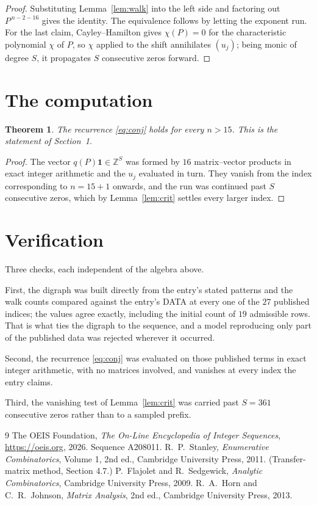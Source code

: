\documentclass[11pt,a4paper]{article}
\theoremstyle{plain}
\newtheorem{theorem}{Theorem}
\theoremstyle{definition}
\begin{document}
\begin{proof}
Substituting Lemma~\ref{lem:walk} into the left side and factoring out
$P^{\,n-2-16}$ gives the identity. The equivalence follows by letting the exponent
run. For the last claim, Cayley--Hamilton gives $\chi(P)=0$ for the characteristic
polynomial $\chi$ of $P$, so $\chi$ applied to the shift annihilates $(u_j)$; being monic of
degree $S$, it propagates $S$ consecutive zeros forward.
\end{proof}

\section{The computation}

\begin{theorem}
The recurrence \eqref{eq:conj} holds for every $n>15$. This is the statement of
Section~1.
\end{theorem}

\begin{proof}
The vector $q(P)\mathbf{1}\in\mathbb{Z}^{S}$ was formed by $16$ matrix--vector
products in exact integer arithmetic and the $u_j$ evaluated in turn. They vanish from the
index corresponding to $n=15+1$ onwards, and the run was continued past $S$ consecutive
zeros, which by Lemma~\ref{lem:crit} settles every larger index.
\end{proof}

\section{Verification}

Three checks, each independent of the algebra above.

First, the digraph was built directly from the entry's stated patterns and the walk counts
compared against the entry's DATA at every one of the $27$ published indices; the
values agree exactly, including the initial count of $19$ admissible rows. That is
what ties the digraph to the sequence, and a model reproducing only part of the published
data was rejected wherever it occurred.

Second, the recurrence \eqref{eq:conj} was evaluated on those published terms in exact
integer arithmetic, with no matrices involved, and vanishes at every index the entry claims.

Third, the vanishing test of Lemma~\ref{lem:crit} was carried past $S=361$ consecutive
zeros rather than to a sampled prefix.

\begin{thebibliography}{9}
 The OEIS Foundation, \emph{The On-Line Encyclopedia of Integer
Sequences}, \url{https://oeis.org}, 2026. Sequence A208011.
 R.~P.~Stanley, \emph{Enumerative Combinatorics}, Volume 1, 2nd ed.,
Cambridge University Press, 2011. (Transfer-matrix method, Section 4.7.)
 P.~Flajolet and R.~Sedgewick, \emph{Analytic Combinatorics}, Cambridge
University Press, 2009.
 R.~A.~Horn and C.~R.~Johnson, \emph{Matrix Analysis}, 2nd ed., Cambridge
University Press, 2013.
\end{thebibliography}
\end{document}

